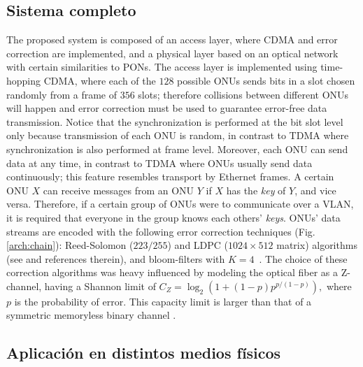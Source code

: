 \documentclass[a4paper,10pt]{report}
\begin{document}
\subsection{Sistema completo}
The proposed system is composed of an access layer, where CDMA and error correction are implemented, and a physical layer based on an optical network with certain similarities to PONs. 
The access layer is implemented using time-hopping CDMA, where each of the $128$ possible ONUs sends bits in a slot chosen randomly from a frame of $356$ slots; therefore
collisions between different ONUs will happen and error correction must be used to guarantee error-free data transmission. 
Notice that the synchronization is performed at the bit slot level only because transmission of each ONU is random, in contrast to TDMA where synchronization is also performed at frame level. 
Moreover, each ONU can send data at any time, in contrast to TDMA where
ONUs usually send data continuously; this feature resembles transport by Ethernet frames.
A certain ONU $X$ can receive messages from an ONU $Y$ if $X$ has the
{\em key} of $Y$, and vice versa. Therefore, if a certain group of ONUs
were to communicate over a VLAN, it is required that everyone in the group
knows each others' {\em keys}.
ONUs' data streams are encoded with the following error correction techniques (Fig. \ref{arch:chain}):
 Reed-Solomon ($223/255$) and LDPC ($1024\times512$ matrix) algorithms (see \cite{Moon:05} and references therein), and bloom-filters with $K=4$~\cite{Bloom70space/timetrade-offs}.
The choice of these correction algorithms was heavy influenced by
modeling the optical fiber as a Z-channel, having a Shannon limit of $ C_{Z} = \log_2\left(1+(1-p) p^{p/(1-p)}\right),$ where $p$ is the probability of error. 
This capacity limit is larger than that of a symmetric memoryless binary channel \cite{Tallini:02}.

\subsection{Aplicación en distintos medios físicos}
\end{document}
